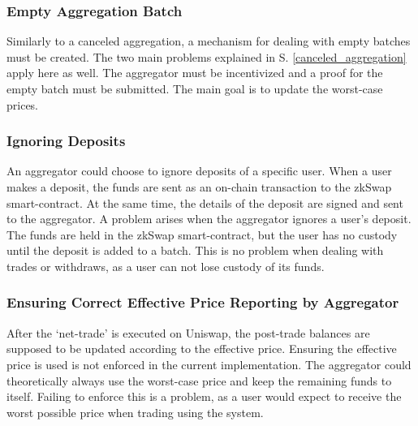 \documentclass[../../thesis.tex]{subfiles}
\begin{document}
\subsubsection{Empty Aggregation Batch}
Similarly to a canceled aggregation, a mechanism for dealing with empty batches must be created. The two main problems explained in S. \ref{canceled_aggregation} apply here as well. The aggregator must be incentivized and a proof for the empty batch must be submitted. The main goal is to update the worst-case prices.

\subsubsection{Ignoring Deposits}
An aggregator could choose to ignore deposits of a specific user. When a user makes a deposit, the funds are sent as an on-chain transaction to the zkSwap smart-contract.  At the same time, the details of the deposit are signed and sent to the aggregator. A problem arises when the aggregator ignores a user's deposit. The funds are held in the zkSwap smart-contract, but the user has no custody until the deposit is added to a batch. This is no problem when dealing with trades or withdraws, as a user can not lose custody of its funds. 

\subsubsection{Ensuring Correct Effective Price Reporting by Aggregator}
After the `net-trade' is executed on Uniswap, the post-trade balances are supposed to be updated according to the effective price. Ensuring the effective price is used is not enforced in the current implementation. The aggregator could theoretically always use the worst-case price and keep the remaining funds to itself. Failing to enforce this is a problem, as a user would expect to receive the worst possible price when trading using the system. 
\end{document}

